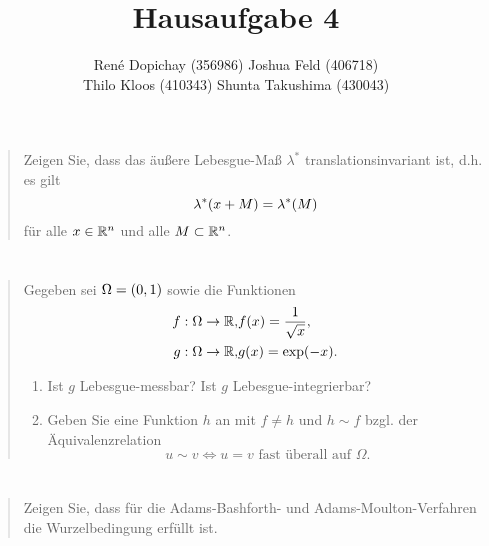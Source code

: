 \documentclass{exercise}
\title{Hausaufgabe 4}
\author{René Dopichay (356986) \quad Joshua Feld (406718)\\Thilo Kloos (410343) \quad Shunta Takushima (430043)}
\begin{document}
	\maketitle


	\section{}

    \begin{quote}
        Zeigen Sie, dass das äußere Lebesgue-Maß \(\lambda^*\) translationsinvariant ist, d.h. es gilt
        \[
            \lambda^*\parentheses*{x + M} = \lambda^*\parentheses*{M}
        \]
        für alle \(x \in \R^n\) und alle \(M \subset \R^n\).
    \end{quote}
    
    
    \section{}
    
    \begin{quote}
        Gegeben sei \(\Omega = \parentheses*{0, 1}\) sowie die Funktionen
        \begin{align*}
            f: \Omega \to \R, &f\parentheses*{x} = \frac{1}{\sqrt{x}},\\
            g: \Omega \to \R, &g\parentheses*{x} = \exp\parentheses*{-x}.
        \end{align*}
        \begin{enumerate}
            \item Ist \(g\) Lebesgue-messbar?
            Ist \(g\) Lebesgue-integrierbar?
            \item Geben Sie eine Funktion \(h\) an mit \(f \ne h\) und \(h \sim f\) bzgl. der Äquivalenzrelation
            \[
                u \sim v \iff u = v\text{ fast überall auf }\Omega.
            \]
        \end{enumerate}
    \end{quote}
    
    
    \section{}
    
    \begin{quote}
        Zeigen Sie, dass für die Adams-Bashforth- und Adams-Moulton-Verfahren die Wurzelbedingung erfüllt ist.
    \end{quote}
    
\end{document}
